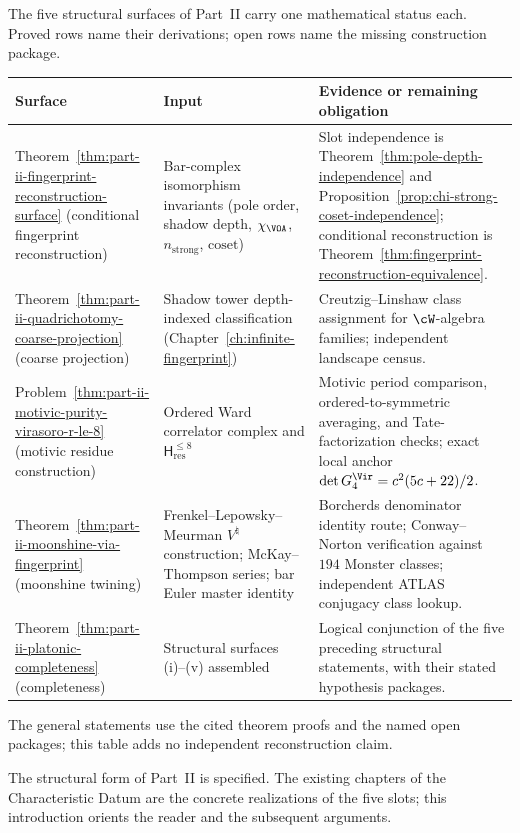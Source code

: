 The five structural surfaces of Part~II carry one mathematical status each.
Proved rows name their derivations; open rows name the missing construction
package.

\begin{center}
\begin{tabular}{p{4cm}|p{5cm}|p{6cm}}
\hline
\textbf{Surface} & \textbf{Input} & \textbf{Evidence or remaining
obligation} \\
\hline
Theorem~\ref{thm:part-ii-fingerprint-reconstruction-surface}
(conditional fingerprint reconstruction)
 & Bar-complex isomorphism invariants
 \textup{(}pole order, shadow depth, $\chi_{\VOA}$,
 $n_{\mathrm{strong}}$, $\mathrm{coset}$\textup{)}
 & Slot independence is
 Theorem~\ref{thm:pole-depth-independence} and
 Proposition~\ref{prop:chi-strong-coset-independence}; conditional
 reconstruction is
 Theorem~\ref{thm:fingerprint-reconstruction-equivalence}. \\
\hline
Theorem~\ref{thm:part-ii-quadrichotomy-coarse-projection}
(coarse projection)
 & Shadow tower
 depth-indexed classification
 \textup{(}Chapter~\ref{ch:infinite-fingerprint}\textup{)}
 & Creutzig--Linshaw class
 assignment for $\cW$-algebra families; independent
 landscape census. \\
\hline
Problem~\ref{thm:part-ii-motivic-purity-virasoro-r-le-8}
(motivic residue construction)
 & Ordered Ward correlator complex and
 $\mathsf H_{\mathrm{res}}^{\le8}$
 & Motivic period comparison, ordered-to-symmetric averaging, and
 Tate-factorization checks; exact local anchor
 $\det G^{\Vir}_{4}=c^2(5c+22)/2$. \\
\hline
Theorem~\ref{thm:part-ii-moonshine-via-fingerprint}
(moonshine twining)
 & Frenkel--Lepowsky--Meurman
 $V^\natural$ construction; McKay--Thompson
 series; bar Euler master identity
 & Borcherds
 denominator identity route; Conway--Norton verification
 against $194$ Monster classes; independent ATLAS conjugacy
 class lookup. \\
\hline
Theorem~\ref{thm:part-ii-platonic-completeness}
(completeness)
 & Structural surfaces (i)--(v) assembled
 & Logical conjunction of the five preceding structural statements,
 with their stated hypothesis packages. \\
\hline
\end{tabular}
\end{center}

The general statements use the cited theorem proofs and the named open
packages; this table adds no independent reconstruction claim.

\medskip

The structural form of Part~II is specified. The existing chapters
of the Characteristic Datum are the concrete realizations of the
five slots; this introduction orients the reader and the subsequent
arguments.

